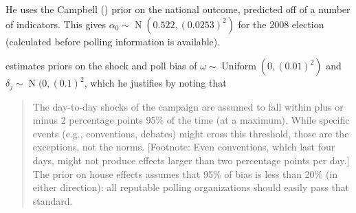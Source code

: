 \documentclass[12pt]{report}
\DeclareMathOperator{\N}{N}
\DeclareMathOperator{\Uniform}{Uniform}
\begin{document}
He uses the Campbell (\citeyear{Campbell:1992aa,Campbell:2006aa}) prior on the national outcome, predicted off of a number of indicators. This gives \(\alpha_0 \sim \N(0.522, (0.0253)^2)\) for the 2008 election (calculated before polling information is available).

\citet{Strauss:2007aa} estimates priors on the shock and poll bias of \(
\omega \sim \Uniform(0, (0.01)^2)\) and \(
\delta_j \sim \N(0, (0.1)^2\), which he justifies by noting that
\begin{quote}
The day-to-day shocks of the campaign are assumed to fall within plus or minus 2 percentage points 95\% of the time (at a maximum). While specific events (e.g., conventions, debates) might cross this threshold, those are the exceptions, not the norms. [Footnote: Even conventions, which last four days, might not produce effects larger than two percentage points per day.] The prior on house effects assumes that 95\% of bias is less than 20\% (in either direction): all reputable polling organizations should easily pass that standard.
\end{quote}
\end{document}
